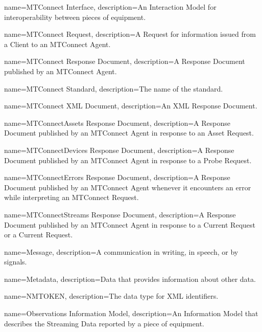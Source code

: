 {
    name={MTConnect Interface},
	description={An \gls{Interaction Model} for interoperability between pieces of equipment.}
}

{
    name={MTConnect Request},
	description={A \gls{Request} for information issued from a \gls{Client} to an \gls{MTConnect Agent}.}
}

{
    name={MTConnect Response Document},
	description={A \gls{Response Document} published by an \gls{MTConnect Agent}.}
}

{
    name={MTConnect Standard},
	description={The name of the standard.}
}

{
    name={MTConnect XML Document},
	description={An XML \gls{Response Document}.}
}

{
    name={MTConnectAssets Response Document},
	description={A \gls{Response Document} published by an \gls{MTConnect Agent} in response to an \gls{Asset Request}.}
}

{
    name={MTConnectDevices Response Document},
	description={A \gls{Response Document} published by an \gls{MTConnect Agent} in response to a \gls{Probe Request}.}
}

{
    name={MTConnectErrors Response Document},
	description={A \gls{Response Document} published by an \gls{MTConnect Agent} whenever it encounters an error while interpreting an \gls{MTConnect Request}.}
}

{
    name={MTConnectStreams Response Document},
	description={A \gls{Response Document} published by an \gls{MTConnect Agent} in response to a \gls{Current Request} or a \gls{Current Request}.}
}

{
    name={Message},
	description={A communication in writing, in speech, or by signals.}
}

{
    name={Metadata},
	description={Data that provides information about other data.
}
}

{
    name={NMTOKEN},
	description={The data type for XML identifiers.}
}

{
    name={Observations Information Model},
	description={An \gls{Information Model} that describes the \gls{Streaming Data} reported by a piece of equipment.}
}

